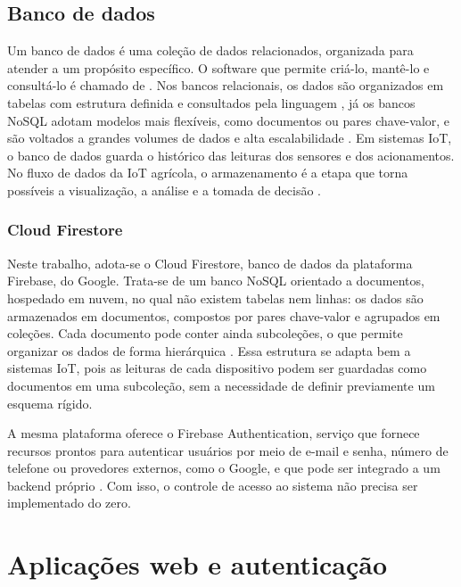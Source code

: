 \subsection{Banco de dados}

Um banco de dados é uma coleção de dados relacionados, organizada para atender a um propósito específico. O software que permite criá-lo, mantê-lo e consultá-lo é chamado de  \cite{elmasri2018}. Nos bancos relacionais, os dados são organizados em tabelas com estrutura definida e consultados pela linguagem , já os bancos NoSQL adotam modelos mais flexíveis, como documentos ou pares chave-valor, e são voltados a grandes volumes de dados e alta escalabilidade \cite{elmasri2018}. Em sistemas IoT, o banco de dados guarda o histórico das leituras dos sensores e dos acionamentos. No fluxo de dados da IoT agrícola, o armazenamento é a etapa que torna possíveis a visualização, a análise e a tomada de decisão \cite{chamara2022}. 

\subsubsection{Cloud Firestore}

Neste trabalho, adota-se o Cloud Firestore, banco de dados da plataforma Firebase, do Google. Trata-se de um banco NoSQL orientado a documentos, hospedado em nuvem, no qual não existem tabelas nem linhas: os dados são armazenados em documentos, compostos por pares chave-valor e agrupados em coleções. Cada documento pode conter ainda subcoleções, o que permite organizar os dados de forma hierárquica \cite{firestore2026}. Essa estrutura se adapta bem a sistemas IoT, pois as leituras de cada dispositivo podem ser guardadas como documentos em uma subcoleção, sem a necessidade de definir previamente um esquema rígido.

A mesma plataforma oferece o Firebase Authentication, serviço que fornece recursos prontos para autenticar usuários por meio de e-mail e senha, número de telefone ou provedores externos, como o Google, e que pode ser integrado a um backend próprio \cite{firebaseauth2026}. Com isso, o controle de acesso ao sistema não precisa ser implementado do zero.

\section{Aplicações web e autenticação}
\label{sec:web-autenticacao}

